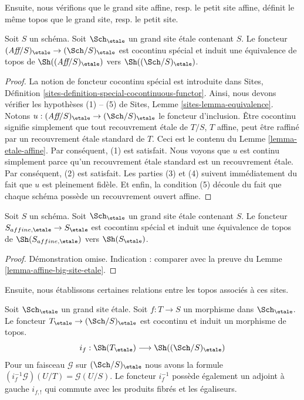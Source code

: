 \noindent
Ensuite, nous vérifions que le grand site affine, resp. le petit site affine, définit le même topos que le grand site, resp. le petit site.

\begin{lemma}
\label{lemma-affine-big-site-etale}
Soit $S$ un schéma. Soit $\Sch_\etale$ un grand site étale contenant $S$. Le foncteur $(\textit{Aff}/S)_\etale \to (\Sch/S)_\etale$ est cocontinu spécial et induit une équivalence de topos de $\Sh((\textit{Aff}/S)_\etale)$ vers $\Sh((\Sch/S)_\etale)$.
\end{lemma}

\begin{proof}
La notion de foncteur cocontinu spécial est introduite dans Sites, Définition \ref{sites-definition-special-cocontinuous-functor}. Ainsi, nous devons vérifier les hypothèses (1) -- (5) de Sites, Lemme \ref{sites-lemma-equivalence}. Notons $u : (\textit{Aff}/S)_\etale \to (\Sch/S)_\etale$ le foncteur d'inclusion. Être cocontinu signifie simplement que tout recouvrement étale de $T/S$, $T$ affine, peut être raffiné par un recouvrement étale standard de $T$. Ceci est le contenu du Lemme \ref{lemma-etale-affine}. Par conséquent, (1) est satisfait. Nous voyons que $u$ est continu simplement parce qu'un recouvrement étale standard est un recouvrement étale. Par conséquent, (2) est satisfait. Les parties (3) et (4) suivent immédiatement du fait que $u$ est pleinement fidèle. Et enfin, la condition (5) découle du fait que chaque schéma possède un recouvrement ouvert affine.
\end{proof}


\begin{lemma}
\label{lemma-alternative}
Soit $S$ un schéma. Soit $\Sch_\etale$ un grand site étale contenant $S$. Le foncteur $S_{affine, \etale} \to S_\etale$ est cocontinu spécial et induit une équivalence de topos de $\Sh(S_{affine, \etale})$ vers $\Sh(S_\etale)$.
\end{lemma}

\begin{proof}
Démonstration omise. Indication : comparer avec la preuve du Lemme \ref{lemma-affine-big-site-etale}.
\end{proof}

\noindent
Ensuite, nous établissons certaines relations entre les topos associés à ces sites.

\begin{lemma}
\label{lemma-put-in-T-etale}
Soit $\Sch_\etale$ un grand site étale. Soit $f : T \to S$ un morphisme dans $\Sch_\etale$. Le foncteur $T_\etale \to (\Sch/S)_\etale$ est cocontinu et induit un morphisme de topos.
$$
i_f :
\Sh(T_\etale)
\longrightarrow
\Sh((\Sch/S)_\etale)
$$
Pour un faisceau $\mathcal{G}$ sur $(\Sch/S)_\etale$ nous avons la formule $(i_f^{-1}\mathcal{G})(U/T) = \mathcal{G}(U/S)$. Le foncteur $i_f^{-1}$ possède également un adjoint à gauche $i_{f, !}$ qui commute avec les produits fibrés et les égaliseurs.
\end{lemma}

